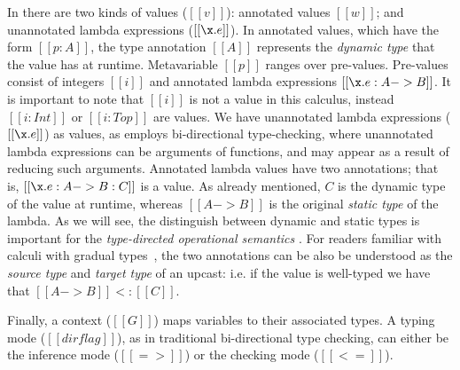 In \name there are two kinds of values ($[[v]]$): annotated values $[[w]]$; and unannotated
lambda expressions ($[[\x.e]]$). In annotated values, which have the form $[[p
:A]]$, the type annotation $[[A]]$ represents the \textit{dynamic type} that the
value has at runtime.
Metavariable $[[p]]$ ranges over pre-values. Pre-values
consist of integers $[[i]]$
and annotated lambda expressions $[[\x.e : A -> B]]$.
It is important to note that $[[i]]$ is not a value in this
calculus, instead $[[i:Int]]$ or $[[i:Top]]$ are values.
We have unannotated lambda expressions ($[[\x.e]]$) as values, as
\name employs bi-directional type-checking, where
unannotated lambda expressions can be arguments of functions, and
may appear as a result of reducing such arguments.
Annotated lambda values have two annotations;
that is, $[[\x.e : A -> B : C]]$ is a value.
As already mentioned, $C$ is the dynamic type of the value
at runtime, whereas $[[A -> B]]$ is the original \emph{static type} of the lambda.
As we will see, the distinguish between dynamic and static
types is important for the \textit{type-directed operational semantics}
\cite{Huang:typedirected}.
For readers familiar with calculi with gradual types~\cite{}, the two annotations
can be also be understood as the \emph{source type} and \emph{target type}
of an upcast: i.e. if the value is well-typed we have that $[[A -> B]] <: [[C]]$.

Finally, a context ($[[G]]$) maps variables to their associated types. A typing
mode ($[[dirflag]]$), as in traditional bi-directional type checking, can either be the
inference mode ($[[=>]]$) or the checking mode ($[[<=]]$).

